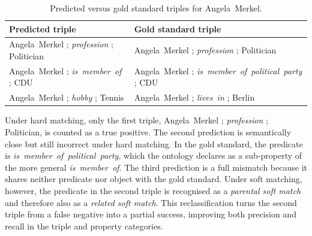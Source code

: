 \documentclass[a4paper,oneside,bibliography=totoc]{scrbook}
\begin{document}
\begin{table}[ht]
  \centering
  \label{tab:merkel_triples}
  \begin{tabular}{p{}p{}}
    \toprule
    \textbf{Predicted triple} & \textbf{Gold standard triple}                               \\ \midrule
    Angela~Merkel ; \textit{profession} ; Politician
                              & Angela~Merkel ; \textit{profession} ; Politician            \\[0.2em]
    Angela~Merkel ; \textit{is~member~of} ; CDU
                              & Angela~Merkel ; \textit{is~member~of~political~party} ; CDU \\[0.2em]
    Angela~Merkel ; \textit{hobby} ; Tennis
                              & Angela~Merkel ; \textit{lives~in} ; Berlin                  \\
    \bottomrule
  \end{tabular}
  \caption{Predicted versus gold standard triples for Angela~Merkel.}
\end{table}

Under hard matching, only the first triple, Angela~Merkel ; \textit{profession} ; Politician, is counted as a true positive. The second prediction is semantically close but still incorrect under hard matching. In the gold standard, the predicate is \textit{is~member~of~political~party}, which the ontology declares as a sub-property of the more general \textit{is~member~of}. The third prediction is a full mismatch because it shares neither predicate nor object with the gold standard. Under soft matching, however, the predicate in the second triple is recognised as a \emph{parental soft match} and therefore also as a \emph{related soft match}. This reclassification turns the second triple from a false negative into a partial success, improving both precision and recall in the triple and property categories.
\end{document}
